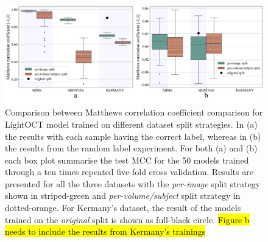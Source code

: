 \documentclass[fleqn,10pt]{wlscirep}
\begin{document}
\begin{figure}[t]
\centering
\includegraphics[width=500pt]{OCT_inflation_results_1_v2.pdf}
\caption{Comparison between Matthews correlation coefficient comparison for LightOCT model trained on different dataset split strategies.  In (a) the results with each sample having the correct label, whereas in (b) the results from the random label experiment. For both (a) and (b) each box plot summarise the test MCC for the 50 models trained through a ten times repeated five-fold cross validation.  Results are presented for all the three datasets with the \textit{per-image} split strategy shown in striped-green and \textit{per-volume/subject} split strategy in dotted-orange. For Kermany's dataset, the result of the models trained on the \textit{original} split is shown as full-black circle. \hl{Figure b needs to include the results from Kermany's trainings}}
\label{fig:results_1}
\end{figure}
\end{document}

